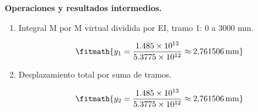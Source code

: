 \noindent\textbf{Operaciones y resultados intermedios.}

\begin{enumerate}

\item Integral M por M virtual dividida por EI, tramo 1: 0 a 3000 mm.

\[\fitmath{y_{1}=\frac{1.485\times10^{13}}{5.3775\times10^{12}}\approx 2{,}761506\,\mathrm{mm}}\]

\item Desplazamiento total por suma de tramos.

\[\fitmath{y_{2}=\frac{1.485\times10^{13}}{5.3775\times10^{12}}\approx 2{,}761506\,\mathrm{mm}}\]

\end{enumerate}

